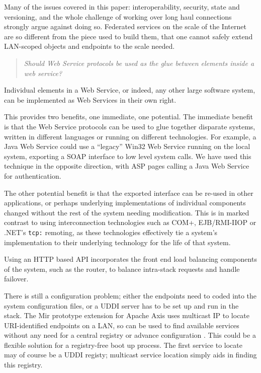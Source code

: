 \documentclass[draft]{report}
\begin{document}
Many of the issues covered in this paper: interoperability, security,
state and versioning, and the whole challenge of working over long haul
connections strongly argue against doing so. Federated services on the
scale of the Internet are so different from the piece used to build
them, that one cannot safely extend LAN-scoped objects and endpoints to
the scale needed.

\begin{quote} \emph{Should Web Service protocols be used as the glue
between elements inside a web service?}

\end{quote}

Individual elements in a Web Service, or indeed, any other large
software system, can be implemented as Web Services in their own right.

This provides two benefits, one immediate, one potential. The immediate
benefit is that the Web Service protocols can be used to glue together
disparate systems, written in different languages or running on
different technologies. For example, a Java Web Service could use a
``legacy'' Win32 Web Service running on the local system, exporting a SOAP
interface to low level system calls. We have used this technique in the
opposite direction, with ASP pages calling a Java Web Service for
authentication.

The other potential benefit is that the exported interface can be
re-used in other applications, or perhaps underlying implementations of
individual components changed without the rest of the system needing
modification. This is in marked contrast to using interconnection
technologies such as COM+, EJB/RMI-IIOP or .NET's \verb$tcp:$ remoting,
as these technologies effectively tie a system's implementation to their
underlying technology for the life of that system.

Using an HTTP based API incorporates the front end load balancing
components of the system, such as the router, to balance intra-stack
requests and handle failover.

There is still a configuration problem; either the endpoints need to
coded into the system configuration files, or a UDDI server has to be
set up and run in the stack. The Mir prototype extension for Apache Axis
uses multicast IP to locate URI-identified endpoints on a LAN, so can be
used to find available services without any need for a central registry
or advance configuration \cite{loughran:mir}. This could be a flexible
solution for a registry-free boot up process. The first service to
locate may of course be a UDDI registy; multicast service location
simply aids in finding this registry.
\end{document}
